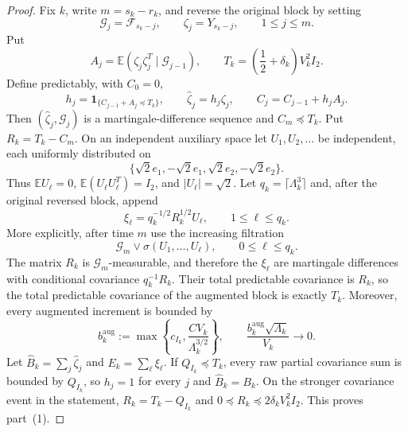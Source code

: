 \documentclass[12pt, reqno, final, a4paper]{amsart}
\theoremstyle{plain}
\theoremstyle{definition}
\theoremstyle{remark}
\newcommand{\E}{\mathbb E}
\newcommand{\1}{\mathbf 1}
\begin{document}
\begin{proof}
Fix $k$, write $m=s_k-r_k$, and reverse the original block by setting
\[
 \mathcal G_j=\mathcal F_{s_k-j},
 \qquad \zeta_j=Y_{s_k-j},
 \qquad 1\le j\le m.
\]
Put
\[
 A_j=\E(\zeta_j\zeta_j^T\mid\mathcal G_{j-1}),
 \qquad
 T_k=\left(\frac12+\delta_k\right)V_k^2I_2.
\]
Define predictably, with $C_0=0$,
\[
 h_j=\mathbf1_{\{C_{j-1}+A_j\preceq T_k\}},
 \qquad
 \widehat\zeta_j=h_j\zeta_j,
 \qquad
 C_j=C_{j-1}+h_jA_j.
\]
Then $(\widehat\zeta_j,\mathcal G_j)$ is a martingale-difference sequence and
$C_m\preceq T_k$. Put $R_k=T_k-C_m$. On an independent auxiliary space let
$U_1,U_2,\ldots$ be independent, each uniformly distributed on
\[
 \{\sqrt2e_1,-\sqrt2e_1,\sqrt2e_2,-\sqrt2e_2\}.
\]
Thus $\E U_\ell=0$, $\E(U_\ell U_\ell^T)=I_2$, and $|U_\ell|=\sqrt2$.
Let $q_k=\lceil\Lambda_k^3\rceil$ and, after the original reversed block,
append
\[
 \xi_\ell=q_k^{-1/2}R_k^{1/2}U_\ell,
 \qquad 1\le\ell\le q_k.
\]
More explicitly, after time $m$ use the increasing filtration
\[
 \mathcal G_m\vee\sigma(U_1,\ldots,U_\ell),
 \qquad 0\le\ell\le q_k.
\]
The matrix $R_k$ is $\mathcal G_m$-measurable, and therefore the $\xi_\ell$
are martingale differences with conditional covariance $q_k^{-1}R_k$.
Their total predictable covariance is $R_k$, so the total predictable
covariance of the augmented block is exactly $T_k$. Moreover, every augmented
increment is bounded by
\begin{equation}\label{eq:augmented-increment-bound}
 b_k^{\mathrm{aug}}:=\max\left\{c_{I_k},\frac{CV_k}{\Lambda_k^{3/2}}\right\},
 \qquad
 \frac{b_k^{\mathrm{aug}}\sqrt{\Lambda_k}}{V_k}\to0.
\end{equation}
Let $\widehat B_k=\sum_j\widehat\zeta_j$ and
$E_k=\sum_\ell\xi_\ell$. If $Q_{I_k}\preceq T_k$, every raw partial
covariance sum is bounded by $Q_{I_k}$, so $h_j=1$ for every $j$ and
$\widehat B_k=B_k$. On the stronger covariance event in the statement,
$R_k=T_k-Q_{I_k}$ and $0\preceq R_k\preceq2\delta_kV_k^2I_2$. This proves
part~(1).


\end{proof}
\end{document}

